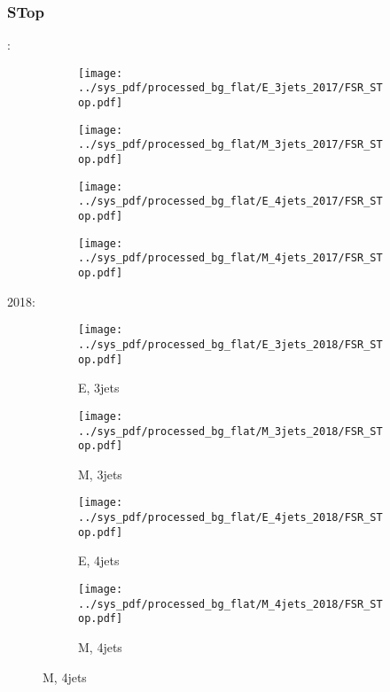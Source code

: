 \documentclass{beamer}
\begin{document}
\begin{frame}
\frametitle{STop}
\fontsize{5}{1}:
\begin{figure}
\centering
\begin{subfigure}[b]{0.24\textwidth}
\texttt{[image: ../sys\_pdf/processed\_bg\_flat/E\_3jets\_2017/FSR\_STop.pdf]}
\end{subfigure}
\begin{subfigure}[b]{0.24\textwidth}
\texttt{[image: ../sys\_pdf/processed\_bg\_flat/M\_3jets\_2017/FSR\_STop.pdf]}
\end{subfigure}
\begin{subfigure}[b]{0.24\textwidth}
\texttt{[image: ../sys\_pdf/processed\_bg\_flat/E\_4jets\_2017/FSR\_STop.pdf]}
\end{subfigure}
\begin{subfigure}[b]{0.24\textwidth}
\texttt{[image: ../sys\_pdf/processed\_bg\_flat/M\_4jets\_2017/FSR\_STop.pdf]}
\end{subfigure}
\end{figure}
2018:
\begin{figure}
\centering
\begin{subfigure}[b]{0.24\textwidth}
\texttt{[image: ../sys\_pdf/processed\_bg\_flat/E\_3jets\_2018/FSR\_STop.pdf]}
\captionsetup{font=tiny}
\caption{E, 3jets}
\end{subfigure}
\begin{subfigure}[b]{0.24\textwidth}
\texttt{[image: ../sys\_pdf/processed\_bg\_flat/M\_3jets\_2018/FSR\_STop.pdf]}
\captionsetup{font=tiny}
\caption{M, 3jets}
\end{subfigure}
\begin{subfigure}[b]{0.24\textwidth}
\texttt{[image: ../sys\_pdf/processed\_bg\_flat/E\_4jets\_2018/FSR\_STop.pdf]}
\captionsetup{font=tiny}
\caption{E, 4jets}
\end{subfigure}
\begin{subfigure}[b]{0.24\textwidth}
\texttt{[image: ../sys\_pdf/processed\_bg\_flat/M\_4jets\_2018/FSR\_STop.pdf]}
\captionsetup{font=tiny}
\caption{M, 4jets}
\end{subfigure}
\end{figure}
\end{frame}
\end{document}
